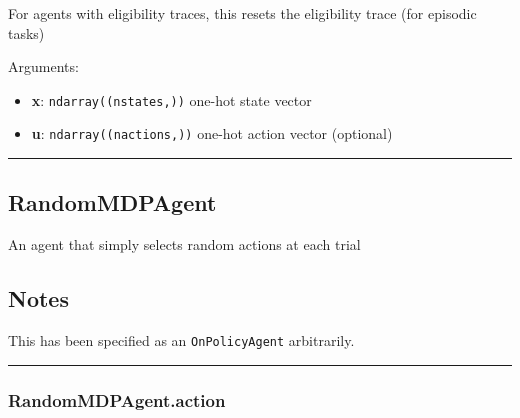 For agents with eligibility traces, this resets the eligibility trace
(for episodic tasks)

Arguments:

\begin{itemize}
\tightlist
\item
  \textbf{x}: \texttt{ndarray((nstates,))} one-hot state vector
\item
  \textbf{u}: \texttt{ndarray((nactions,))} one-hot action vector
  (optional)
\end{itemize}

\begin{center}\rule{0.5\linewidth}{\linethickness}\end{center}

\hypertarget{randommdpagent}{%
\subsection{RandomMDPAgent}\label{randommdpagent}}

\begin{Shaded}
\begin{Highlighting}[]
\end{Highlighting}
\end{Shaded}

An agent that simply selects random actions at each trial

\hypertarget{notes}{%
\subsection{Notes}\label{notes}}

This has been specified as an \texttt{OnPolicyAgent} arbitrarily.

\begin{center}\rule{0.5\linewidth}{\linethickness}\end{center}

\hypertarget{randommdpagent.action}{%
\subsubsection{RandomMDPAgent.action}\label{randommdpagent.action}}

\begin{Shaded}
\begin{Highlighting}[]
\end{Highlighting}
\end{Shaded}

